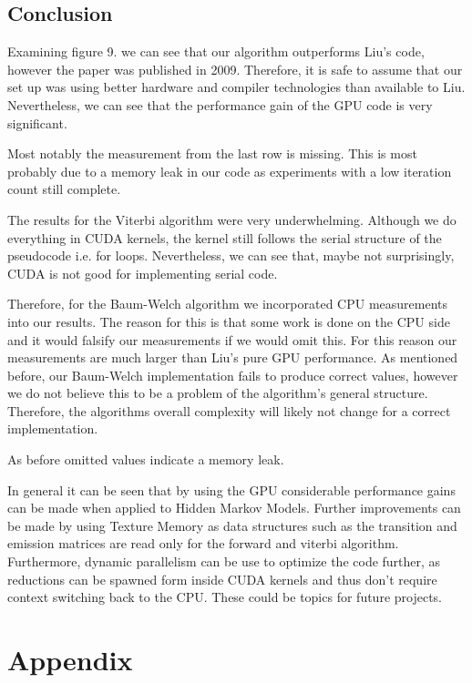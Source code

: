 \documentclass[english, paper=a4]{scrartcl}
\begin{document}
\subsection{Conclusion}

Examining figure 9. we can see that our algorithm outperforms Liu's code, however the paper was published in 2009. Therefore, it is safe to assume that our set up was using better hardware and compiler technologies than available to Liu. Nevertheless, we can see that the performance gain of the GPU code is very significant.

Most notably the measurement from the last row is missing. This is most probably due to a memory leak in our code as experiments with a low iteration count still complete.

The results for the Viterbi algorithm were very underwhelming. Although we do everything in CUDA kernels, the kernel still follows the serial structure of the pseudocode i.e. for loops. Nevertheless, we can see that, maybe not surprisingly, CUDA is not good for implementing serial code.

Therefore, for the Baum-Welch algorithm we incorporated CPU measurements into our results. The reason for this is that some work is done on the CPU side and it would falsify our measurements if we would omit this. For this reason our measurements are much larger than Liu's pure GPU performance. As mentioned before, our Baum-Welch implementation fails to produce correct values, however we do not believe this to be a problem of the algorithm's general structure. Therefore, the algorithms overall complexity will likely not change for a correct implementation.

As before omitted values indicate a memory leak.

In general it can be seen that by using the GPU considerable performance gains can be made when applied to Hidden Markov Models. Further improvements can be made by using Texture Memory \cite{cuhmm} as data structures such as the transition and emission matrices are read only for the forward and viterbi algorithm. Furthermore, dynamic parallelism can be use to optimize the code further, as reductions can be spawned form inside CUDA kernels and thus don't require context switching back to the CPU. These could be topics for future projects.

\newpage

\section{Appendix}
\end{document}
